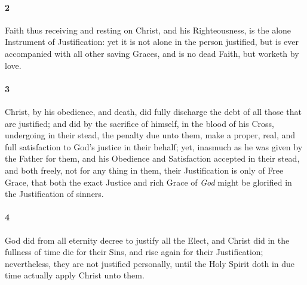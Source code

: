 \documentclass[
    paper=letterpaper,
    11pt,
    twoside,
    DIV=calc,
    openany
]{scrbook}
\newcommand{\oldgrammar}[2]{#2}
\begin{document}
\footnotebegin
{}
\footnoteend

\paragraph{2} %
Faith thus receiving and resting on Christ, and his Righteousness, is the \R{}alone Instrument of Justification: yet it is not alone in the person justified, but is ever accompanied with all other saving Graces, and is no dead Faith, \R{}but worketh by love.

\footnotebegin
{}
\footnoteend

\paragraph{3} %
Christ, by his obedience, and death, did fully discharge the debt of all those that are justified; and did by the sacrifice of himself, in the blood of his Cross, undergoing in their stead, the penalty due unto them, make a proper, real, and full satisfaction \R{}to God’s justice in their behalf; yet, inasmuch as he was given by the Father for them, and his Obedience and Satisfaction accepted in their stead, and both \R{}freely, not for any thing in them, their Justification is \oldgrammar{onely}{only} of Free Grace, that both the exact Justice and rich Grace of \textit{God} might be \R{}glorified in the Justification of sinners.

\footnotebegin
{}
\footnoteend

\paragraph{4} %
God did from all eternity decree to \R{}\oldgrammar{justifie}{justify} all the Elect, and Christ did in the fullness of time die for their Sins, and rise \R{}again for their Justification; nevertheless, they are not justified personally, until the Holy Spirit doth in due time \R{}actually apply Christ unto them.

\footnotebegin
{}
\footnoteend
\end{document}
